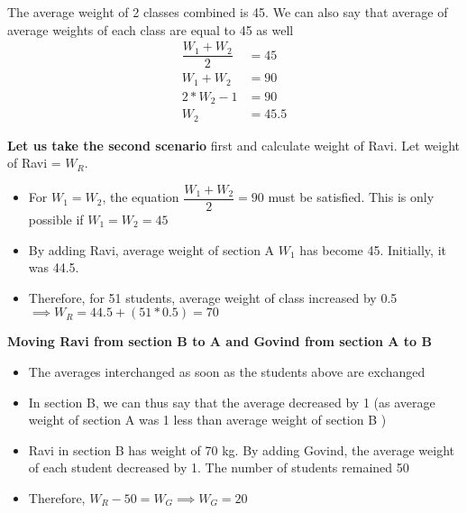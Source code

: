 The average weight of 2 classes combined is 45. We can also say that average of average weights of each class are equal to 45 as well
\begin{align*}
    \dfrac{W_1 + W_2}{2} &= 45 \\
    W_1 + W_2 &= 90 \\
    2 * W_2 - 1 &= 90 \tag{$W_1 = W_2 - 1$ as mentioned in question} \\
    W_2 &= 45.5
\end{align*}

\textbf{Let us take the second scenario} first and calculate weight of Ravi. Let weight of Ravi = $W_R$.  

\begin{itemize}
    \item For $W_1 = W_2$, the equation $\dfrac{W_1 + W_2}{2} = 90$ must be satisfied. This is only possible if $W_1 = W_2 = 45$
    \item By adding Ravi, average weight of section A $W_1$ has become 45. Initially, it was 44.5.
    \item Therefore, for 51 students, average weight of class increased by 0.5 $\implies W_R = 44.5 + (51 * 0.5) = 70$
\end{itemize}

\textbf{Moving Ravi from section B to A and Govind from section A to B}

\begin{itemize}
    \item The averages interchanged as soon as the students above are exchanged
    \item In section B, we can thus say that the average decreased by 1 (as average weight of section A was 1 less than average weight of section B )
    \item Ravi in section B has weight of 70 kg. By adding Govind, the average weight of each student decreased by 1. The number of students remained 50\
    \item Therefore, $W_R - 50 = W_G \implies W_G = 20$ 
\end{itemize}